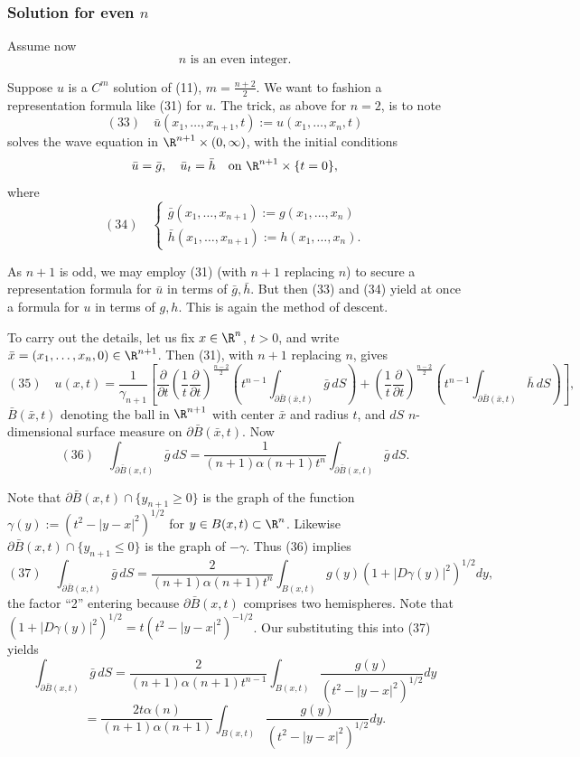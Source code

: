 \subsubsection{Solution for even $n$}
\label{sec:wave-solution-even-n}

Assume now
$$n \text{ is an even integer.}$$

Suppose $u$ is a $C^m$ solution of (11), $m = \frac{n+2}{2}$. We want to fashion a representation formula like (31) for $u$. The trick, as above for $n = 2$, is to note
$$(33) \quad \bar{u}(x_1, \ldots, x_{n+1}, t) := u(x_1, \ldots, x_n, t)$$
solves the wave equation in $\R^{n+1} \times (0,\infty)$, with the initial conditions
$$\bar{u} = \bar{g}, \quad \bar{u}_t = \bar{h} \quad \text{on } \R^{n+1} \times \{t = 0\},$$
where
$$(34) \quad \begin{cases}
\bar{g}(x_1,\ldots,x_{n+1}) := g(x_1,\ldots,x_n)\\
\bar{h}(x_1,\ldots,x_{n+1}) := h(x_1,\ldots,x_n).
\end{cases}$$

As $n+1$ is odd, we may employ (31) (with $n+1$ replacing $n$) to secure a representation formula for $\bar{u}$ in terms of $\bar{g}, \bar{h}$. But then (33) and (34) yield at once a formula for $u$ in terms of $g, h$. This is again the method of descent.

To carry out the details, let us fix $x \in \R^n$, $t > 0$, and write $\bar{x} = (x_1,\ldots,x_n,0) \in \R^{n+1}$. Then (31), with $n+1$ replacing $n$, gives
$$(35) \quad u(x,t) = \frac{1}{\gamma_{n+1}} \left[ \frac{\partial}{\partial t} \left(\frac{1}{t}\frac{\partial}{\partial t}\right)^{\frac{n-2}{2}} \left( t^{n-1} \int_{\partial \bar{B}(\bar{x},t)} \bar{g} \, dS \right) + \left(\frac{1}{t}\frac{\partial}{\partial t}\right)^{\frac{n-2}{2}} \left( t^{n-1} \int_{\partial \bar{B}(\bar{x},t)} \bar{h} \, dS \right) \right],$$
$\bar{B}(\bar{x},t)$ denoting the ball in $\R^{n+1}$ with center $\bar{x}$ and radius $t$, and $dS$ $n$-dimensional surface measure on $\partial\bar{B}(\bar{x},t)$. Now
$$(36) \quad \int_{\partial\bar{B}(x,t)} \bar{g} \, dS = \frac{1}{(n+1)\alpha(n+1)t^n} \int_{\partial \bar B(x,t)} \bar{g} \, dS.$$

Note that $\partial\bar{B}(x,t) \cap \{y_{n+1} \geq 0\}$ is the graph of the function $\gamma(y) := (t^2 - |y-x|^2)^{1/2}$ for $y \in B(x,t) \subset \R^n$. Likewise $\partial\bar{B}(x,t) \cap \{y_{n+1} \leq 0\}$ is the graph of $-\gamma$. Thus (36) implies
$$(37) \quad \int_{\partial\bar{B}(x,t)} \bar{g} \, dS = \frac{2}{(n+1)\alpha(n+1)t^n} \int_{B(x,t)} g(y)(1+|D\gamma(y)|^2)^{1/2} dy,$$
the factor ``2'' entering because $\partial\bar{B}(x,t)$ comprises two hemispheres. Note that $(1+|D\gamma(y)|^2)^{1/2} = t(t^2-|y-x|^2)^{-1/2}$. Our substituting this into (37) yields
$$\int_{\partial\bar{B}(x,t)} \bar{g} \, dS = \frac{2}{(n+1)\alpha(n+1)t^{n-1}} \int_{B(x,t)} \frac{g(y)}{(t^2-|y-x|^2)^{1/2}} dy$$
$$= \frac{2t\alpha(n)}{(n+1)\alpha(n+1)} \int_{B(x,t)} \frac{g(y)}{(t^2-|y-x|^2)^{1/2}} dy.$$

